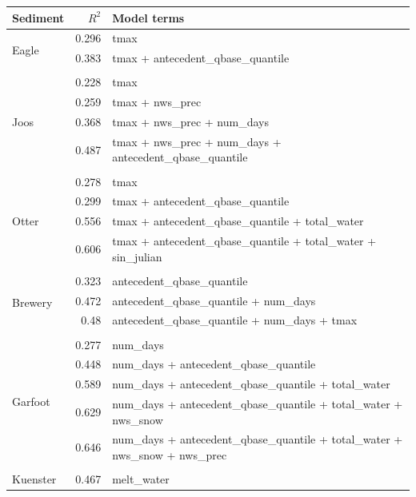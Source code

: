 \documentclass[10pt]{article}
\begin{document}
\begin{table}[h] \small
    \begin{center}
    \begin{tabular}{lrl}
    \textbf{Sediment} & $R^2$ & Model terms \\
    \hline
\multirow{3}{*}{Eagle} & 0.296 & tmax\\ 
 & 0.383 & tmax + antecedent\_qbase\_quantile\\ 
\vspace{2mm}\\ \multirow{5}{*}{Joos} & 0.228 & tmax\\ 
 & 0.259 & tmax + nws\_prec\\ 
 & 0.368 & tmax + nws\_prec + num\_days\\ 
 & 0.487 & tmax + nws\_prec + num\_days + antecedent\_qbase\_quantile\\ 
\vspace{2mm}\\ \multirow{5}{*}{Otter} & 0.278 & tmax\\ 
 & 0.299 & tmax + antecedent\_qbase\_quantile\\ 
 & 0.556 & tmax + antecedent\_qbase\_quantile + total\_water\\ 
 & 0.606 & tmax + antecedent\_qbase\_quantile + total\_water + sin\_julian\\ 
\vspace{2mm}\\ \multirow{4}{*}{Brewery} & 0.323 & antecedent\_qbase\_quantile\\ 
 & 0.472 & antecedent\_qbase\_quantile + num\_days\\ 
 & 0.48 & antecedent\_qbase\_quantile + num\_days + tmax\\ 
\vspace{2mm}\\ \multirow{6}{*}{Garfoot} & 0.277 & num\_days\\ 
 & 0.448 & num\_days + antecedent\_qbase\_quantile\\ 
 & 0.589 & num\_days + antecedent\_qbase\_quantile + total\_water\\ 
 & 0.629 & num\_days + antecedent\_qbase\_quantile + total\_water + nws\_snow\\ 
 & 0.646 & num\_days + antecedent\_qbase\_quantile + total\_water + nws\_snow + nws\_prec\\ 
\vspace{2mm}\\ \multirow{4}{*}{Kuenster} & 0.467 & melt\_water\\ 

\end{tabular}
\end{center}
\end{table}
\end{document}
